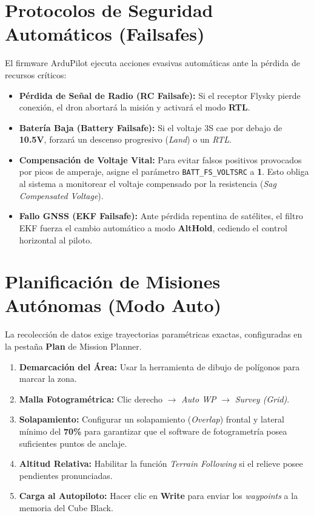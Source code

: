 \documentclass[12pt,a4paper]{article}
\begin{document}
\section{Protocolos de Seguridad Automáticos (Failsafes)}
El firmware ArduPilot ejecuta acciones evasivas automáticas ante la pérdida de recursos críticos:
\begin{itemize}[leftmargin=*]
    \item \textbf{Pérdida de Señal de Radio (RC Failsafe):} Si el receptor Flysky pierde conexión, el dron abortará la misión y activará el modo \textbf{RTL}.
    \item \textbf{Batería Baja (Battery Failsafe):} Si el voltaje 3S cae por debajo de \textbf{10.5V}, forzará un descenso progresivo (\textit{Land}) o un \textit{RTL}. 
    \item \textbf{Compensación de Voltaje Vital:} Para evitar falsos positivos provocados por picos de amperaje, asigne el parámetro \texttt{BATT\_FS\_VOLTSRC} a \textbf{1}. Esto obliga al sistema a monitorear el voltaje compensado por la resistencia (\textit{Sag Compensated Voltage}).
    \item \textbf{Fallo GNSS (EKF Failsafe):} Ante pérdida repentina de satélites, el filtro EKF fuerza el cambio automático a modo \textbf{AltHold}, cediendo el control horizontal al piloto.
\end{itemize}

\section{Planificación de Misiones Autónomas (Modo Auto)}
La recolección de datos exige trayectorias paramétricas exactas, configuradas en la pestaña \textbf{Plan} de Mission Planner.
\begin{enumerate}[leftmargin=*]
    \item \textbf{Demarcación del Área:} Usar la herramienta de dibujo de polígonos para marcar la zona.
    \item \textbf{Malla Fotogramétrica:} Clic derecho $\rightarrow$ \textit{Auto WP} $\rightarrow$ \textit{Survey (Grid)}.
    \item \textbf{Solapamiento:} Configurar un solapamiento (\textit{Overlap}) frontal y lateral mínimo del \textbf{70\%} para garantizar que el software de fotogrametría posea suficientes puntos de anclaje.
    \item \textbf{Altitud Relativa:} Habilitar la función \textit{Terrain Following} si el relieve posee pendientes pronunciadas.
    \item \textbf{Carga al Autopiloto:} Hacer clic en \textbf{Write} para enviar los \textit{waypoints} a la memoria del Cube Black. 
\end{enumerate}
\end{document}
